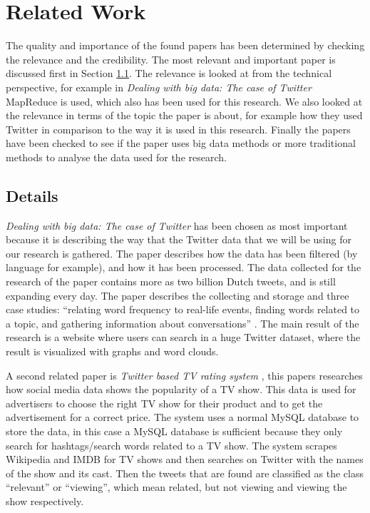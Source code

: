 \section{Related Work}
The quality and importance of the found papers has been determined by checking the relevance and the credibility. The most relevant and important paper is discussed first in Section \ref{subsec:relatedWorkDetails}. The relevance is looked at from the technical perspective, for example in \emph{Dealing with big data: The case of Twitter} \cite{sangDealingWithBigData} MapReduce is used, which also has been used for this research. We also looked at the relevance in terms of the topic the paper is about, for example how they used Twitter in comparison to the way it is used in this research. Finally the papers have been checked to see if the paper uses big data methods or more traditional methods to analyse the data used for the research.

\subsection{Details} \label{subsec:relatedWorkDetails}
\emph{Dealing with big data: The case of Twitter} \cite{sangDealingWithBigData} has been chosen as most important because it is describing the way that the Twitter data that we will be using for our research is gathered. The paper describes how the data has been filtered (by language for example), and how it has been processed. The data collected for the research of the paper contains more as two billion Dutch tweets, and is still expanding every day. The paper describes the collecting and storage and three case studies: ``relating word frequency to real-life events, finding words related to a topic, and gathering information about conversations'' \cite{sangDealingWithBigData}. The main result of the research is a website where users can search in a huge Twitter dataset, where the result is visualized with graphs and word clouds.

A second related paper is \emph{Twitter based TV rating system} \cite{souzaTwitterBasedTVRatingSystem}, this papers researches how social media data shows the popularity of a TV show. This data is used for advertisers to choose the right TV show for their product and to get the advertisement for a correct price. The system uses a normal MySQL database to store the data, in this case a MySQL database is sufficient because they only search for hashtags/search words related to a TV show. The system scrapes Wikipedia and IMDB for TV shows and then searches on Twitter with the names of the show and its cast. Then the tweets that are found are classified as the class ``relevant'' or ``viewing'', which mean related, but not viewing and viewing the show respectively.

